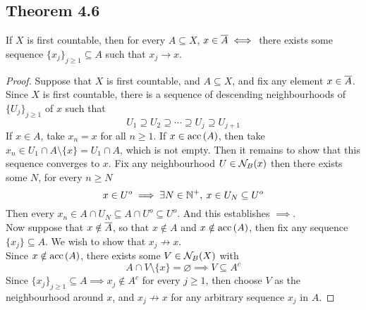 \documentclass[../../main.tex]{subfiles}
\begin{document}
\subsection{Theorem 4.6}
\begin{wts}
    If $X$ is first countable, then for every $A\subseteq X$, $x\in \overline{A}\iff$ there exists some sequence $\{x_j\}_{j\geq 1}\subseteq A$ such that $x_j\to x$.
\end{wts}
\begin{proof}
    Suppose that $X$ is first countable, and $A\subseteq X$, and fix any element $x\in\overline{A}$. Since $X$ is first countable, there is a sequence of descending neighbourhoods of $\{U_j\}_{j\geq 1}$ of $x$ such that
    \[
    U_1\supseteq U_2\supseteq \cdots\supseteq U_j\supseteq U_{j+1}
    \]
    If $x\in A$, take $x_n = x$ for all $n\geq 1$. If $x\in\operatorname{acc}{(A)}$, then take $x_n\in U_1\cap A\setminus \{x\}=U_1\cap A$, which is not empty. Then it remains to show that this sequence converges to $x$. Fix any neighbourhood $U\in\mathcal{N}_B({x})$ then there exists some $N$, for every $n\geq N$
    \[
    x\in U^o\implies \exists N\in\mathbb{N}^+, \: x\in U_N\subseteq U^o
    \]
    Then every $x_n\in A\cap U_N\subseteq A\cap U^o\subseteq U^o$. And this establishes $\implies$.\\
    
    Now suppose that $x\notin \overline{A}$, so that $x\notin A$ and $x\notin \operatorname{acc}{(A)}$, then fix any sequence $\{x_j\}\subseteq A$. We wish to show that $x_j\not\to x$.\\
    
    Since $x\notin \operatorname{acc}{(A)}$, there exists some $V\in\mathcal{N}_B({X})$ with
    \[
    A\cap V\setminus\{x\}=\varnothing\implies V\subseteq A^c
    \]
    Since $\{x_j\}_{j\geq 1}\subseteq A\implies x_j\notin A^c$ for every $j\geq 1$, then choose $V$ as the neighbourhood around $x$, and $x_j\not\to x$ for any arbitrary sequence $x_j$ in $A$.
\end{proof}
\end{document}
